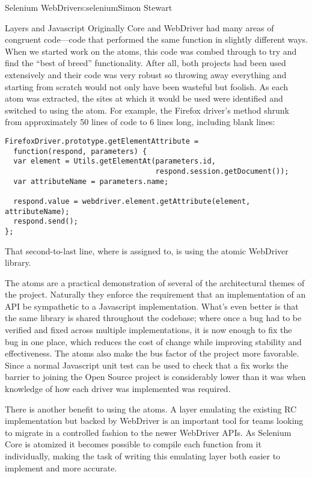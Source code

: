 \begin{aosachapter}{Selenium WebDriver}{s:selenium}{Simon Stewart}
\begin{aosasect1}{Layers and Javascript}
Originally Core and WebDriver had many areas of congruent code---code
that performed the same function in slightly different ways. When we
started work on the atoms, this code was combed through to try and
find the ``best of breed'' functionality. After all, both projects had
been used extensively and their code was very robust so throwing away
everything and starting from scratch would not only have been wasteful
but foolish.  As each atom was extracted, the sites at which it would
be used were identified and switched to using the atom. For example,
the Firefox driver's  method shrunk from
approximately 50 lines of code to 6 lines long, including blank lines:

\begin{verbatim}
FirefoxDriver.prototype.getElementAttribute =
  function(respond, parameters) {
  var element = Utils.getElementAt(parameters.id,
                                   respond.session.getDocument());
  var attributeName = parameters.name;

  respond.value = webdriver.element.getAttribute(element, attributeName);
  respond.send();
};
\end{verbatim}

\noindent That second-to-last line, where  is assigned to,
is using the atomic WebDriver library.

The atoms are a practical demonstration of several of the
architectural themes of the project. Naturally they enforce the
requirement that an implementation of an API be sympathetic to a
Javascript implementation. What's even better is that the same library
is shared throughout the codebase; where once a bug had to be verified
and fixed across multiple implementations, it is now enough to fix the
bug in one place, which reduces the cost of change while improving
stability and effectiveness. The atoms also make the bus factor of the
project more favorable. Since a normal Javascript unit test can be
used to check that a fix works the barrier to joining the Open Source
project is considerably lower than it was when knowledge of how each
driver was implemented was required.

There is another benefit to using the atoms. A layer emulating the
existing RC implementation but backed by WebDriver is an important
tool for teams looking to migrate in a controlled fashion to the newer
WebDriver APIs. As Selenium Core is atomized it becomes possible to
compile each function from it individually, making the task of writing
this emulating layer both easier to implement and more accurate.


\end{aosasect1}
\end{aosachapter}
